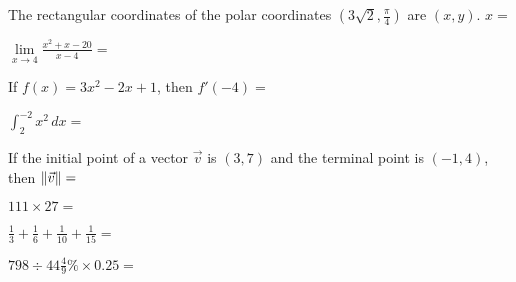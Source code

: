 \documentclass{numbersense}
\begin{document}
\begin{questions}
    \q The rectangular coordinates of the polar coordinates
    $(3 \sqrt{2}, \frac{\pi}{4})$ are $(x, y)$. $x= $\ans

    \q $\lim\limits_{x \to  4} \frac{x^2 + x - 20}{x-4} = $ \ans

    \q If $f(x) = 3x^2 - 2x + 1$, then $f'(-4) = $ \ans


    \q $\displaystyle\int^{-2}_{2} x^2 \, dx = $ \ans


    \q If the initial point of a vector $\vec{v}$ is $(3, 7)$ and the terminal
    point is $(-1, 4)$, then $\lVert \vec{v} \rVert =$ \ans

    \q $111 \times 27 = $ \ans

    \q $\frac{1}{3}+  \frac{1}{6} +  \frac{1}{10} +  \frac{1}{15} =$ \ans

    \aq $798 \div 44\frac{4}{9}\% \times 0.25 = $ \ans




  \end{questions}
\end{document}
